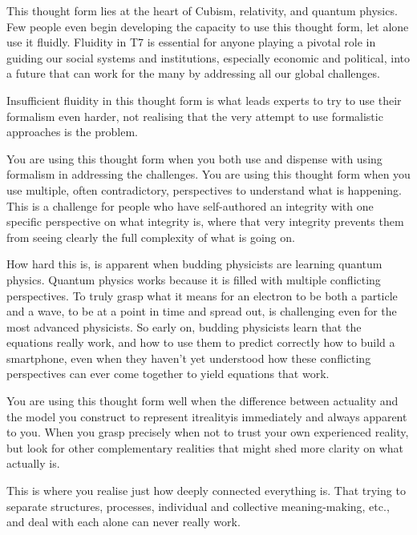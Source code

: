 This thought form lies at the heart of Cubism, relativity,  and quantum physics.  Few people even begin developing the capacity to use this thought form, let alone use it fluidly. Fluidity in T7 is essential for anyone playing a pivotal role in guiding our social systems and institutions, especially economic and political, into a future that can work for the many by addressing all our global challenges.


Insufficient fluidity in this thought form is what leads experts to try to use their formalism even harder, not realising that the very attempt to use formalistic approaches is the problem.


You are using this thought form when you both use and dispense with using formalism in addressing the challenges. You are using this thought form when you use multiple, often contradictory, perspectives to understand what is happening. This is a challenge for people who have self-authored an integrity with one specific perspective on what integrity is, where that very integrity prevents them from seeing clearly the full complexity of what is going on.


How hard this is, is apparent when budding physicists  are learning quantum physics. Quantum physics works because it is filled with multiple conflicting perspectives. To truly grasp what it means for an electron to be both a particle and a wave, to be at a point in time and spread out, is challenging even for the most advanced physicists. So early on, budding physicists learn that the equations really work, and how to use them to predict correctly how to build a smartphone, even when they haven't yet understood how these conflicting perspectives can ever come together to yield equations that work.


You are using this thought form well when the difference between actuality  and the model you construct to represent it\textemdash reality\textemdash is immediately and always apparent to you. When you grasp precisely when not to trust your own experienced reality,  but look for other complementary realities that might shed more clarity on what actually is.


This is where you realise just how deeply connected everything is. That trying to separate structures, processes, individual and collective meaning-making, etc., and deal with each alone can never really work.






